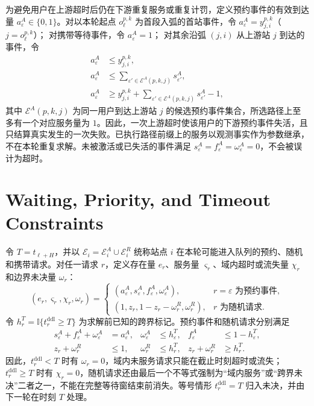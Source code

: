 \documentclass[12pt,a4paper,UTF8]{ctexart}
\begin{document}
为避免用户在上游超时后仍在下游重复服务或重复计罚，定义预约事件的有效到达量 $a_\varepsilon^A\in\{0,1\}$。对以本轮起点 $o_\ell^{p,k}$ 为首段入弧的首站事件，令
$a_\varepsilon^A=y_{j,i}^{p,k}$（$j=o_\ell^{p,k}$）；
对携带等待事件，令 $a_\varepsilon^A=1$；
对其余沿弧 $(j,i)$ 从上游站 $j$ 到达的事件，令
\begin{subequations}
\label{eq:reservation_alive_chain}
\begin{align}
a_\varepsilon^A&\le y_{j,i}^{p,k},\\
a_\varepsilon^A&\le
\sum_{\varepsilon'\in\mathcal E^A(p,k,j)}s_{\varepsilon'}^A,\\
a_\varepsilon^A&\ge y_{j,i}^{p,k}
+\sum_{\varepsilon'\in\mathcal E^A(p,k,j)}s_{\varepsilon'}^A-1,
\end{align}
\end{subequations}
其中 $\mathcal E^A(p,k,j)$ 为同一用户到达上游站 $j$ 的候选预约事件集合，所选路径上至多有一个对应服务量为 $1$。因此，一次上游超时使该用户的下游预约事件失活，且只结算真实发生的一次失败。已执行路径前缀上的服务以观测事实作为参数继承，不在本轮重复求解。未被激活或已失活的事件满足 $s_\varepsilon^A=f_\varepsilon^A=\omega_\varepsilon^A=0$，不会被误计为超时。


\section{Waiting, Priority, and Timeout Constraints}
\label{app:waiting}

令 $T=t_{\ell+H}$，并以 $\mathcal E_i=\mathcal E_i^A\cup\mathcal E_i^R$ 统称站点 $i$ 在本轮可能进入队列的预约、随机和携带请求。对任一请求 $r$，定义存在量 $e_r$、服务量 $\varsigma_r$、域内超时或流失量 $\chi_r$ 和边界未决量 $\omega_r$：
\[
(e_r,\varsigma_r,\chi_r,\omega_r)
=
\begin{cases}
(a_\varepsilon^A,s_\varepsilon^A,f_\varepsilon^A,\omega_\varepsilon^A),
&r=\varepsilon\text{ 为预约事件},\\
(1,z_r,1-z_r-\omega_r^R,\omega_r^R),
&r\text{ 为随机请求}.
\end{cases}
\]
令 $h_r^T=\mathbb I\{t_r^{\mathrm{ddl}}\ge T\}$ 为求解前已知的跨界标记。预约事件和随机请求分别满足
\begin{subequations}
\label{eq:request_outcome_conservation}
\begin{align}
s_\varepsilon^A+f_\varepsilon^A+\omega_\varepsilon^A
&=a_\varepsilon^A,&
\omega_\varepsilon^A&\le h_\varepsilon^T,&
f_\varepsilon^A&\le1-h_\varepsilon^T,\label{eq:reservation_outcome_boundary}\\
z_r+\omega_r^R&\le1,&
\omega_r^R&\le h_r^T,&
z_r+\omega_r^R&\ge h_r^T.\label{eq:random_outcome_boundary}
\end{align}
\end{subequations}
因此，$t_r^{\mathrm{ddl}}<T$ 时有 $\omega_r=0$，域内未服务请求只能在截止时刻超时或流失；$t_r^{\mathrm{ddl}}\ge T$ 时有 $\chi_r=0$，随机请求还由最后一个不等式强制为“域内服务”或“跨界未决”二者之一，不能在完整等待窗结束前消失。等号情形 $t_r^{\mathrm{ddl}}=T$ 归入未决，并由下一轮在时刻 $T$ 处理。
\end{document}
